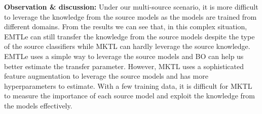 \textbf{Observation \& discussion:} Under our multi-source scenario, it is more difficult to leverage the knowledge from the source models as the models are trained from different domains. From the results we can see that, in this complex situation, EMTLe can still transfer the knowledge from the source models despite the type of the source classifiers while MKTL can hardly leverage the source knowledge. EMTLe uses a simple way to leverage the source models and BO can help us better estimate the transfer parameter. However, MKTL uses a sophisticated feature augmentation to leverage the source models and has more hyperparameters to estimate. With a few training data, it is difficult for MKTL to measure the importance of each source model and exploit the knowledge from the models effectively.




